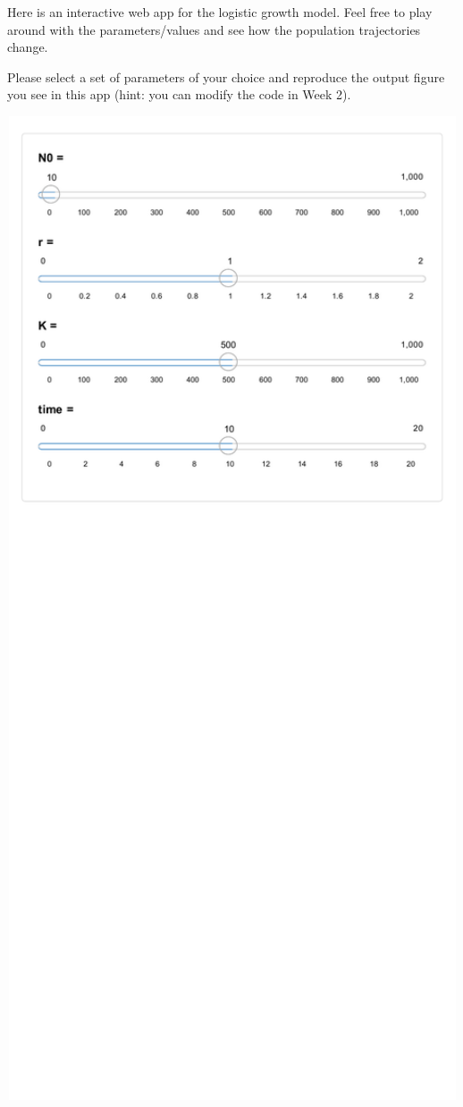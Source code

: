 \documentclass[
]{book}
\begin{document}
Here is an interactive web app for the logistic growth model. Feel free to play around with the parameters/values and see how the population trajectories change.

Please select a set of parameters of your choice and reproduce the output figure you see in this app (hint: you can modify the code in Week 2).

\href{https://genchanghsu0115.shinyapps.io/Logistic_mod_shinyapp/}{\includegraphics[width=800px]{03_Week_3_files/figure-latex/unnamed-chunk-2-1} }
\end{document}
